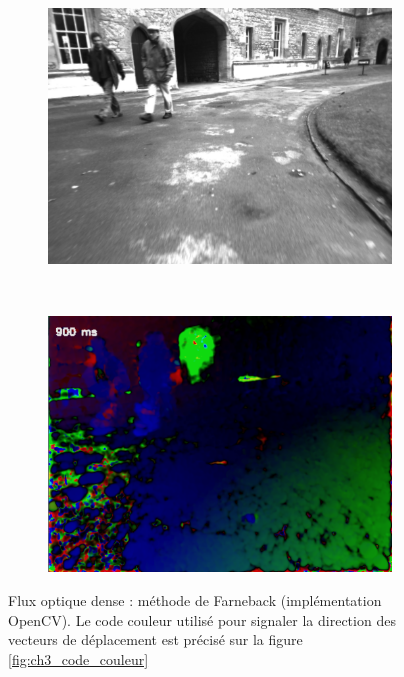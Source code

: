 \begin{figure}
	\begin{subfigure}{0.48\textwidth}
		\includegraphics[width=\textwidth]{Chapter3/graphics/OF_Farneback_RAW.png} 
	\end{subfigure}
	~
	\begin{subfigure}{0.48\textwidth}
		\includegraphics[width=\textwidth]{Chapter3/graphics/OF_Farneback.png}
	\end{subfigure}
	
	\caption{Flux optique dense : méthode de Farneback (implémentation OpenCV). Le code couleur utilisé pour signaler la direction des vecteurs de déplacement est précisé sur la figure \ref{fig:ch3_code_couleur}}
	\label{fig:ch3_OF_Farneback}
\end{figure}

